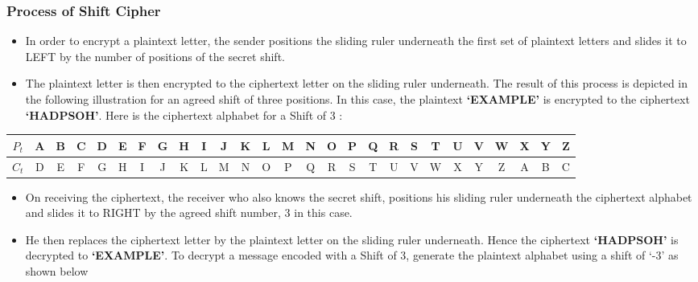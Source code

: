 \documentclass[british]{report}
\providecommand{\tabularnewline}{\\}
\begin{document}
\subsubsection{Process of Shift Cipher}
\begin{itemize}
	\item In order to encrypt a plaintext letter, the sender positions the sliding
	      ruler underneath the first set of plaintext letters and slides it
	      to LEFT by the number of positions of the secret shift.
	\item The plaintext letter is then encrypted to the ciphertext letter on
	      the sliding ruler underneath. The result of this process is depicted
	      in the following illustration for an agreed shift of three positions.
	      In this case, the plaintext \textbf{`EXAMPLE'} is encrypted to the
	      ciphertext \textbf{`HADPSOH'}. Here is the ciphertext alphabet for
	      a Shift of 3 :
\end{itemize}
\begin{center}
	{\scriptsize{}}%
	\begin{tabular}{|c|c|c|c|c|c|c|c|c|c|c|c|c|c|c|c|c|c|c|c|c|c|c|c|c|c|c|}
		\hline
		{\scriptsize{}$P_{t}$} & {\scriptsize{}A} & {\scriptsize{}B} & {\scriptsize{}C} & {\scriptsize{}D} & {\scriptsize{}E} & {\scriptsize{}F} & {\scriptsize{}G} & {\scriptsize{}H} & {\scriptsize{}I} & {\scriptsize{}J} & {\scriptsize{}K} & {\scriptsize{}L} & {\scriptsize{}M} & {\scriptsize{}N} & {\scriptsize{}O} & {\scriptsize{}P} & {\scriptsize{}Q} & {\scriptsize{}R} & {\scriptsize{}S} & {\scriptsize{}T } & {\scriptsize{}U} & {\scriptsize{}V} & {\scriptsize{}W} & {\scriptsize{}X} & {\scriptsize{}Y} & {\scriptsize{}Z}\tabularnewline
		\hline
		\hline
		{\scriptsize{}$C_{t}$} & {\scriptsize{}D} & {\scriptsize{}E} & {\scriptsize{}F} & {\scriptsize{}G} & {\scriptsize{}H} & {\scriptsize{}I} & {\scriptsize{}J} & {\scriptsize{}K} & {\scriptsize{}L} & {\scriptsize{}M} & {\scriptsize{}N} & {\scriptsize{}O} & {\scriptsize{}P} & {\scriptsize{}Q} & {\scriptsize{}R} & {\scriptsize{}S} & {\scriptsize{}T} & {\scriptsize{}U} & {\scriptsize{}V} & {\scriptsize{}W}  & {\scriptsize{}X} & {\scriptsize{}Y} & {\scriptsize{}Z} & {\scriptsize{}A} & {\scriptsize{}B} & {\scriptsize{}C}\tabularnewline
		\hline
	\end{tabular}{\scriptsize\par}
	\par\end{center}
\begin{itemize}
	\item On receiving the ciphertext, the receiver who also knows the secret
	      shift, positions his sliding ruler underneath the ciphertext alphabet
	      and slides it to RIGHT by the agreed shift number, 3 in this case.
	\item He then replaces the ciphertext letter by the plaintext letter on
	      the sliding ruler underneath. Hence the ciphertext \textbf{`HADPSOH'}
	      is decrypted to \textbf{`EXAMPLE'}. To decrypt a message encoded
	      with a Shift of 3, generate the plaintext alphabet using a shift of
	      `-3' as shown below \textminus{}
\end{itemize}
\end{document}
